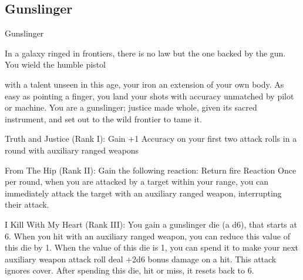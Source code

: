 \subsection{Gunslinger}

                                                  Gunslinger  

In a galaxy ringed in frontiers, there is no law but the one backed by the gun. You wield the humble pistol  

with a talent unseen in this age, your iron an extension of your own body. As easy as pointing a finger, you  
land your shots with accuracy unmatched by pilot or machine. You are a gunslinger; justice made whole,  
given its sacred instrument, and set out to the wild frontier to tame it.   

Truth and Justice (Rank I): Gain +1 Accuracy on your first two attack rolls in a round with  
auxiliary ranged weapons
 
From The Hip (Rank II): Gain the following reaction:  
         Return fire  
         Reaction  
         Once per round, when you are attacked by a target within your range, you can  
         immediately attack the target with an auxiliary ranged weapon, interrupting their attack.
 
I Kill With My Heart (Rank III): You gain a gunslinger die (a d6), that starts at 6. When you hit  
with an auxiliary ranged weapon, you can reduce this value of this die by 1. When the value of  
this die is 1, you can spend it to make your next auxiliary weapon attack roll deal +2d6 bonus  
damage on a hit. This attack ignores cover. After spending this die, hit or miss, it resets back to  
6.